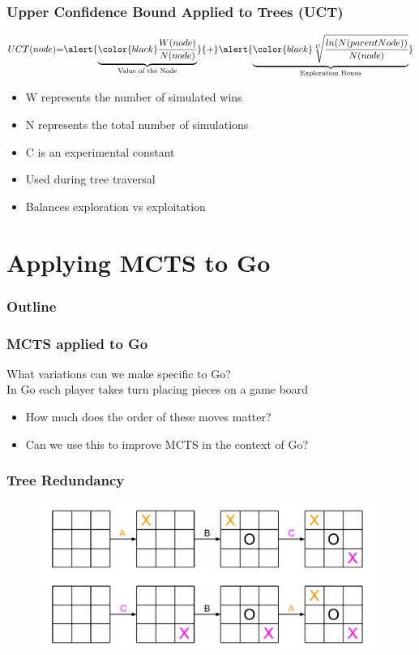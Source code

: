 \documentclass{beamer}
\begin{document}
\begin{frame}[fragile]
\frametitle{Upper Confidence Bound Applied to Trees (UCT)}
\[
	UCT(node)
	{=}
	\alert{\underbrace{\color{black} \frac{W(node)}{N(node)}}_
		{{\text{Value of the Node}}}}
	{+}
	\alert{\underbrace{\color{black} \sqrt[C]{\frac{ln(N(parentNode))}{N(node)}}}_
		{\text{Exploration Bonus}}}
\]
\begin{itemize}
	\item W represents the number of simulated wins
	\item N represents the total number of simulations
	\item C is an experimental constant
	\item Used during tree traversal
	\item Balances exploration vs exploitation
\end{itemize}
\end{frame}

\section{Applying MCTS to Go}

\begin{frame}
\frametitle{Outline}
\tableofcontents[currentsection]
\end{frame}

\begin{frame}
\frametitle{MCTS applied to Go}
What variations can we make specific to Go? \\
In Go each player takes turn placing pieces on a game board
\begin{itemize}
	\item How much does the order of these moves matter?
	\item Can we use this to improve MCTS in the context of Go?
\end{itemize}
\end{frame}

\begin{frame}[fragile]
\frametitle{Tree Redundancy}
\begin{figure}[h]
	\includegraphics[width=11cm]{Diagrams/TicTacToe/MoveOrderNotMattering.pdf}
	\centering
\end{figure}
\end{frame}
\end{document}
